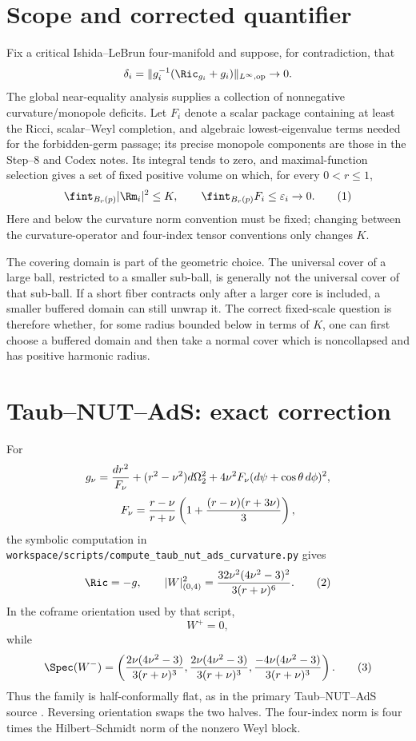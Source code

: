 
\section{Scope and corrected quantifier}

Fix a critical Ishida--LeBrun four-manifold and suppose, for contradiction,
that
\[
 \delta_i=\|g_i^{-1}(\Ric_{g_i}+g_i)\|_{L^\infty,\mathrm{op}}\to0.
\]
The global near-equality analysis supplies a collection of nonnegative
curvature/monopole deficits.  Let $F_i$ denote a scalar package containing at
least the Ricci, scalar--Weyl completion, and algebraic lowest-eigenvalue
terms needed for the forbidden-germ passage; its precise monopole components
are those in the Step--8 and Codex notes.  Its integral tends to zero, and
maximal-function selection gives a set of fixed positive volume on which,
for every $0<r\le1$,
\[
 \fint_{B_r(p)}|\Rm_i|^2\le K,
 \qquad \fint_{B_r(p)}F_i\le\varepsilon_i\to0.       \tag{1}
\]
Here and below the curvature norm convention must be fixed; changing between
the curvature-operator and four-index tensor conventions only changes $K$.

The covering domain is part of the geometric choice.  The universal cover of
a large ball, restricted to a smaller sub-ball, is generally not the
universal cover of that sub-ball.  If a short fiber contracts only after a
larger core is included, a smaller buffered domain can still unwrap it.  The
correct fixed-scale question is therefore whether, for some radius bounded
below in terms of $K$, one can first choose a buffered domain and then take a
normal cover which is noncollapsed and has positive harmonic radius.

\section{Taub--NUT--AdS: exact correction}

For
\[
 g_\nu={dr^2\over F_\nu}+(r^2-\nu^2)d\Omega_2^2
 +4\nu^2F_\nu(d\psi+\cos\theta\,d\phi)^2,
\]
\[
 F_\nu={r-\nu\over r+\nu}
 \left(1+{(r-\nu)(r+3\nu)\over3}\right),
\]
the symbolic computation in
\texttt{workspace/scripts/compute\_taub\_nut\_ads\_curvature.py} gives
\[
 \Ric=-g,
 \qquad
 |W|_{(0,4)}^2={32\nu^2(4\nu^2-3)^2\over3(r+\nu)^6}.             \tag{2}
\]
In the coframe orientation used by that script,
\[
 W^+=0,
\]
while
\[
 \Spec(W^-)=\left(
 {2\nu(4\nu^2-3)\over3(r+\nu)^3},
 {2\nu(4\nu^2-3)\over3(r+\nu)^3},
 {-4\nu(4\nu^2-3)\over3(r+\nu)^3}
 \right).                                                       \tag{3}
\]
Thus the family is half-conformally flat, as in the primary Taub--NUT--AdS
source \cite{akbar2002classical}.  Reversing orientation swaps the two
halves.  The four-index norm is four times the Hilbert--Schmidt norm of the
nonzero Weyl block.

